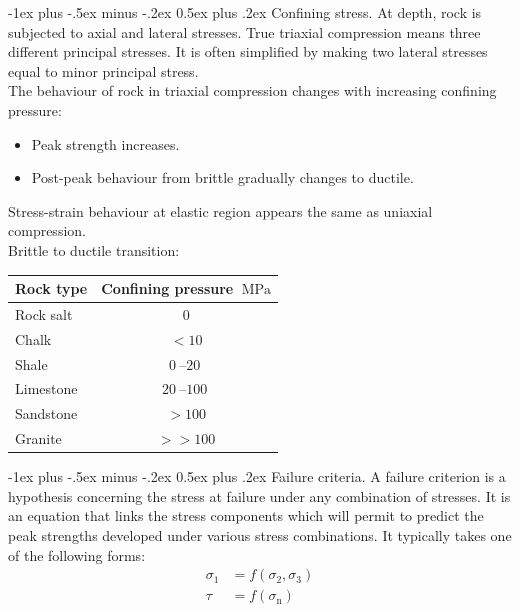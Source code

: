 \documentclass[10pt,landscape,a4paper]{article}
\makeatletter
\renewcommand{\section}{\@startsection{section}{1}{0mm}%
	{-1ex plus -.5ex minus -.2ex}%
	{0.5ex plus .2ex}%
	{\normalfont\large\bfseries}}
\makeatother
\begin{document}
\begin{multicols}{3}
	\section{Confining stress.}
	At depth, rock is subjected to axial and lateral stresses.
	True triaxial compression means three different principal stresses.
	It is often simplified by making two lateral stresses equal to minor principal stress.\\
	The behaviour of rock in triaxial compression changes with increasing confining pressure:
	\begin{itemize}
		\item Peak strength increases.
		\item Post-peak behaviour from brittle gradually changes to ductile.
	\end{itemize}
	Stress-strain behaviour at elastic region appears the same as uniaxial compression.\\
	Brittle to ductile transition:\\
	\begin{table}[H]\scriptsize\centering\begin{tabular}{l c}
			Rock type & Confining pressure $\SI{}{\mega\pascal}$ \\
			\hline
			Rock salt & $0$                                      \\
			Chalk     & $<10$                                    \\
			Shale     & $\SIrange{0}{20}{}$                      \\
			Limestone & $\SIrange{20}{100}{}$                    \\
			Sandstone & $>100$                                   \\
			Granite   & $>>100$

			
		\end{tabular}\end{table}
	
	\section{Failure criteria.}
	A failure criterion is a hypothesis concerning the stress at failure under any combination of stresses.
	It is an equation that links the stress components which will permit to predict the peak strengths developed under various stress combinations.
	It typically takes one of the following forms:
	\begin{align*}
		\sigma_1 & =f(\sigma_2,\sigma_3) \\
		\tau     & =f(\sigma_\text{n})
	\end{align*}
	

\end{multicols}
\end{document}
